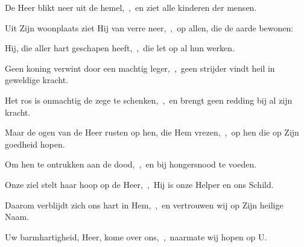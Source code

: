 \documentclass[12pt,twoside,a5paper]{article}
\begin{document}

\begin{halfparskip}
  De Heer blikt neer uit de hemel,~\sep\ en ziet alle kinderen der mensen.

  Uit Zijn woonplaats ziet Hij van verre neer,~\sep\ op allen, die de aarde bewonen:

  Hij, die aller hart geschapen heeft,~\sep\ die let op al hun werken.

  Geen koning verwint door een machtig leger,~\sep\ geen strijder vindt heil in geweldige kracht.

  Het ros is onmachtig de zege te schenken,~\sep\ en brengt geen redding bij al zijn kracht.

  Maar de ogen van de Heer rusten op hen, die Hem vrezen,~\sep\ op hen die op Zijn goedheid hopen.

  Om hen te ontrukken aan de dood,~\sep\ en bij hongersnood te voeden.
\end{halfparskip}


\begin{halfparskip}
  Onze ziel stelt haar hoop op de Heer,~\sep\ Hij is onze Helper en ons Schild.

  Daarom verblijdt zich ons hart in Hem,~\sep\ en vertrouwen wij op Zijn heilige Naam.

  Uw barmhartigheid, Heer, kome over ons,~\sep\ naarmate wij hopen op U.
\end{halfparskip}


\end{document}
